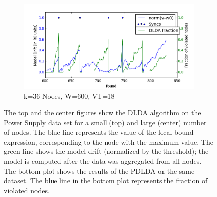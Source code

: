 \begin{figure}[ht!]
    \begin{subfigure}[b]{0.5\textwidth}
        \includegraphics[width=\textwidth]{PowerSupply/36nodesProb.png}
        \caption{k=36 Nodes, W=600, VT=18}
    \end{subfigure}
    \caption{The top and the center figures show the DLDA algorithm on the Power Supply data set for a small (top) and large (center) number of nodes. The blue line represents the value of the local bound expression, corresponding to the node with the maximum value. The green line shows the model drift (normalized by the threshold); the model is computed after the data was aggregated from all nodes. The bottom plot shows the results of the PDLDA on the same dataset. The blue line in the bottom plot represents the fraction of violated nodes.}\label{PowerSupplyFigures}
\end{figure}

